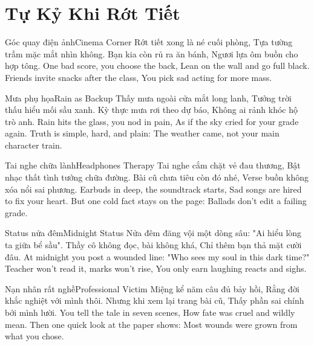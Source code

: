 \chapter{Tự Kỷ Khi Rớt Tiết}

\begin{tutuyetbox}{Góc quay điện ảnh}{Cinema Corner}
Rớt tiết xong là né cuối phòng,
Tựa tường trầm mặc mắt nhìn không.
Bạn kia còn rủ ra ăn bánh,
Ngươi lựa ôm buồn cho hợp tông.
\tcblower
One bad score, you choose the back,
Lean on the wall and go full black.
Friends invite snacks after the class,
You pick sad acting for more mass.
\end{tutuyetbox}

\begin{tutuyetbox}{Mưa phụ họa}{Rain as Backup}
Thấy mưa ngoài cửa mắt long lanh,
Tưởng trời thấu hiểu mối sầu xanh.
Kỳ thực mưa rơi theo dự báo,
Không ai rảnh khóc hộ trò anh.
\tcblower
Rain hits the glass, you nod in pain,
As if the sky cried for your grade again.
Truth is simple, hard, and plain:
The weather came, not your main character train.
\end{tutuyetbox}

\begin{tutuyetbox}{Tai nghe chữa lành}{Headphones Therapy}
Tai nghe cắm chặt vẻ đau thương,
Bật nhạc thất tình tưởng chữa đường.
Bài cũ chưa tiêu còn đó nhé,
Verse buồn không xóa nổi sai phương.
\tcblower
Earbuds in deep, the soundtrack starts,
Sad songs are hired to fix your heart.
But one cold fact stays on the page:
Ballads don't edit a failing grade.
\end{tutuyetbox}

\begin{tutuyetbox}{Status nửa đêm}{Midnight Status}
Nửa đêm đăng vội một dòng sâu:
"Ai hiểu lòng ta giữa bể sầu".
Thầy cô không đọc, bài không khá,
Chỉ thêm bạn thả mặt cười đâu.
\tcblower
At midnight you post a wounded line:
"Who sees my soul in this dark time?"
Teacher won't read it, marks won't rise,
You only earn laughing reacts and sighs.
\end{tutuyetbox}

\begin{tutuyetbox}{Nạn nhân rất nghề}{Professional Victim}
Miệng kể năm câu đủ bảy hồi,
Rằng đời khắc nghiệt với mình thôi.
Nhưng khi xem lại trang bài cũ,
Thấy phần sai chính bởi mình lười.
\tcblower
You tell the tale in seven scenes,
How fate was cruel and wildly mean.
Then one quick look at the paper shows:
Most wounds were grown from what you chose.
\end{tutuyetbox}


